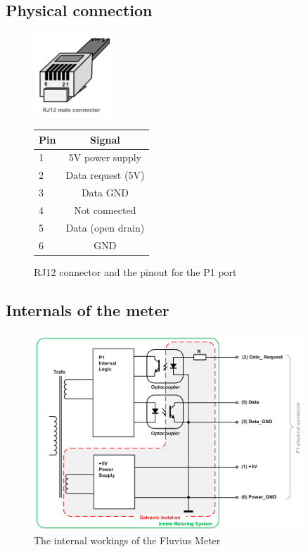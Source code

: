 \documentclass[a4paper,twoside, 12pt]{report}
\theoremstyle{break}
\begin{document}
\subsection{Physical connection}

\begin{figure}[!ht]
    \centering
    \includegraphics[width=3cm]{RJ12.png}
    \qquad
    \begin{tabular}{l|c} %
    \hline
      \textbf{Pin} & \textbf{Signal}\\
      \hline
      1 & 5V power supply\\
      2 & Data request (5V)\\
      3 & Data GND\\
      4 & Not connected\\
      5 & Data (open drain)\\
      6 & GND\\
    \end{tabular}
    \captionsetup{labelformat=andtable}
    \caption{RJ12 connector and the pinout for the P1 port}
  \end{figure}
  
\subsection{Internals of the meter}
\begin{figure}[H]
  \centering
  \includegraphics[width=0.9\textwidth]{MeterIntern.png}
  \caption{The internal workings of the Fluvius Meter}
\end{figure}
\end{document}
